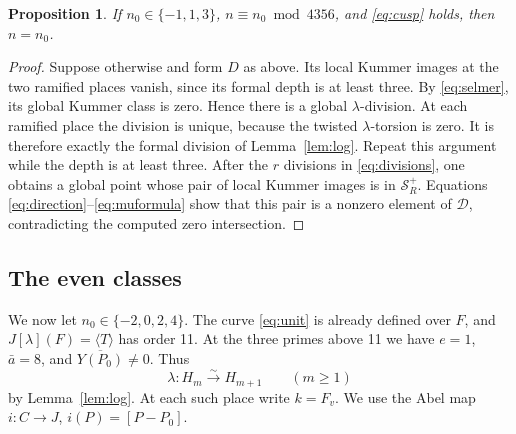 \documentclass[11pt,reqno]{amsart}
\newtheorem{proposition}[theorem]{Proposition}
\theoremstyle{definition}\newtheorem{definition}[theorem]{Definition}
\theoremstyle{remark}\newtheorem{remark}[theorem]{Remark}
\numberwithin{equation}{section}
\begin{document}
\begin{proposition}\label{prop:odd}
If \(n_0\in\{-1,1,3\}\), \(n\equiv n_0\bmod4356\), and
\eqref{eq:cusp} holds, then \(n=n_0\).
\end{proposition}
\begin{proof}
Suppose otherwise and form \(D\) as above. Its local Kummer images at
the two ramified places vanish, since its formal depth is at least
three. By \eqref{eq:selmer}, its global Kummer class is zero. Hence
there is a global \(\lambda\)-division.
At each ramified place the division is unique, because the twisted
\(\lambda\)-torsion is zero. It is therefore exactly the formal
division of Lemma~\ref{lem:log}.
Repeat this argument while the depth is at least three. After the
\(r\) divisions in \eqref{eq:divisions}, one obtains a global point
whose pair of local Kummer images is in \(\mathcal S_R^+\).
Equations \eqref{eq:direction}--\eqref{eq:muformula} show that this
pair is a nonzero element of \(\mathcal D\), contradicting the
computed zero intersection.
\end{proof}


\subsection{The even classes}
We now let \(n_0\in\{-2,0,2,4\}\). The curve \eqref{eq:unit} is
already defined over \(F\), and \(J[\lambda](F)=\langle T\rangle\)
has order 11. At the three primes above 11 we have \(e=1\),
\(\bar a=8\), and \(\overline{Y(P_0)}\ne0\). Thus
\begin{equation}\label{eq:even-division}
 \lambda:H_m\xrightarrow{\sim}H_{m+1}\qquad(m\ge1)
\end{equation}
by Lemma~\ref{lem:log}.
At each such place write \(k=F_v\). We use the Abel map
\(i:C\to J\), \(i(P)=[P-P_0]\).
\end{document}

